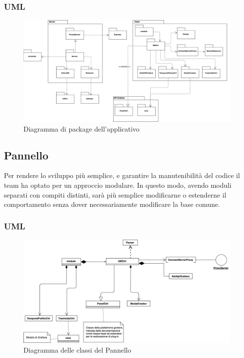 \subsubsection{UML}
\begin{landscape}
\begin{figure}[H]
	\begin{center}
		\includegraphics[scale=0.44]{./images/packageClassi.png} 
	\end{center}
	\caption{Diagramma di package dell'applicativo}
\end{figure}

\end{landscape}


\subsection{Pannello}\label{archPannello}
Per rendere lo sviluppo più semplice, e garantire la manutenibilità del codice il team ha optato per un approccio modulare. In questo modo, avendo moduli separati con compiti distinti, sarà più semplice modificarne o estenderne il comportamento senza dover necessariamente modificare la base comune.\\


\subsubsection{UML}
\begin{figure}[H]
	\includegraphics[width=\textwidth]{./images/plugin_non_espanso.png}
	\caption{Diagramma delle classi del Pannello}
\end{figure}

